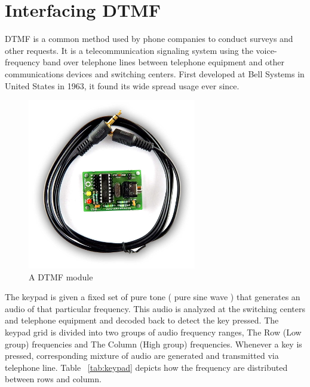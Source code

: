 \chapter{Interfacing DTMF}
\label{ch:dtmf}

\ac{DTMF} is a common method used by phone companies to conduct surveys and other requests. It is a telecommunication signaling system using the voice-frequency band over telephone lines between telephone equipment and other communications devices and switching centers. First developed at Bell Systems in United States in 1963, it found its wide spread usage ever since.

\begin{figure}
    \centering
    \includegraphics[width=2.9in]{Images/DTMF/DTMF_module.jpg}
    \caption[DTMF Module]{A \ac{DTMF} module }
\end{figure}

\par The keypad is given a fixed set of pure tone ( pure sine wave ) that generates an audio of that particular frequency. This audio is analyzed at the switching centers and telephone equipment and decoded back to detect the key pressed. The keypad grid is divided into two groups of audio frequency ranges, The Row (Low group) frequencies and The Column (High group) frequencies. Whenever a key is pressed, corresponding mixture of audio are generated and transmitted via telephone line. Table ~\ref{tab:keypad} depicts how the frequency are distributed between rows and column.

